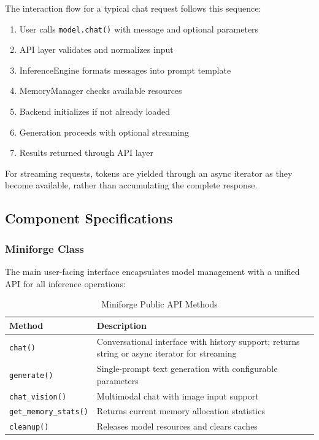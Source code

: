 The interaction flow for a typical chat request follows this sequence:

\begin{enumerate}
    \item User calls \texttt{model.chat()} with message and optional parameters
    \item API layer validates and normalizes input
    \item InferenceEngine formats messages into prompt template
    \item MemoryManager checks available resources
    \item Backend initializes if not already loaded
    \item Generation proceeds with optional streaming
    \item Results returned through API layer
\end{enumerate}

For streaming requests, tokens are yielded through an async iterator as they become available, rather than accumulating the complete response.

\subsection{Component Specifications}

\subsubsection{Miniforge Class}

The main user-facing interface encapsulates model management with a unified API for all inference operations:

\begin{table}[h]
\centering
\caption{Miniforge Public API Methods}
\label{tab:miniforge_api}
\begin{tabular}{lp{7cm}}
\toprule
\textbf{Method} & \textbf{Description} \\
\midrule
\texttt{chat()} & Conversational interface with history support; returns string or async iterator for streaming \\
\texttt{generate()} & Single-prompt text generation with configurable parameters \\
\texttt{chat\_vision()} & Multimodal chat with image input support \\
\texttt{get\_memory\_stats()} & Returns current memory allocation statistics \\
\texttt{cleanup()} & Releases model resources and clears caches \\
\bottomrule
\end{tabular}
\end{table}

